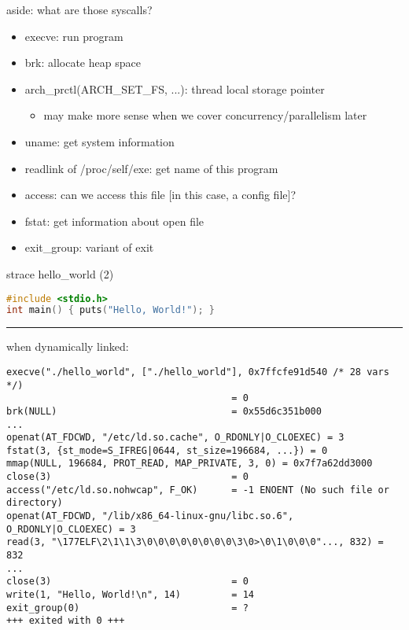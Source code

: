 \begin{frame}{aside: what are those syscalls?}
\begin{itemize}
\item execve: run program
\item brk: allocate heap space
\item arch\_prctl(ARCH\_SET\_FS, ...): thread local storage pointer
    \begin{itemize}
    \item may make more sense when we cover concurrency/parallelism later
    \end{itemize}
\item uname: get system information
\item readlink of /proc/self/exe: get name of this program
\item access: can we access this file [in this case, a config file]?
\item fstat: get information about open file
\item exit\_group: variant of exit
\end{itemize}
\end{frame}

\begin{frame}[fragile]{strace hello\_world (2)}
\begin{lstlisting}[language=C,style=smaller]
#include <stdio.h>
int main() { puts("Hello, World!"); }
\end{lstlisting}
\hrule
\small when dynamically linked:
\begin{Verbatim}[fontsize=\fontsize{9.5}{10.5}\selectfont]
execve("./hello_world", ["./hello_world"], 0x7ffcfe91d540 /* 28 vars */) 
                                        = 0
brk(NULL)                               = 0x55d6c351b000
...
openat(AT_FDCWD, "/etc/ld.so.cache", O_RDONLY|O_CLOEXEC) = 3
fstat(3, {st_mode=S_IFREG|0644, st_size=196684, ...}) = 0
mmap(NULL, 196684, PROT_READ, MAP_PRIVATE, 3, 0) = 0x7f7a62dd3000
close(3)                                = 0
access("/etc/ld.so.nohwcap", F_OK)      = -1 ENOENT (No such file or directory)
openat(AT_FDCWD, "/lib/x86_64-linux-gnu/libc.so.6", O_RDONLY|O_CLOEXEC) = 3
read(3, "\177ELF\2\1\1\3\0\0\0\0\0\0\0\0\3\0>\0\1\0\0\0"..., 832) = 832
...
close(3)                                = 0
write(1, "Hello, World!\n", 14)         = 14
exit_group(0)                           = ?
+++ exited with 0 +++
\end{Verbatim}
\end{frame}
